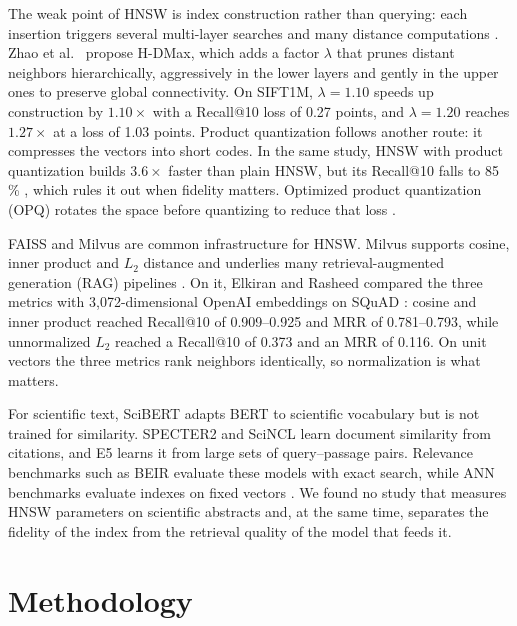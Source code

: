 \documentclass[runningheads]{llncs}
\begin{document}
The weak point of HNSW is index construction rather than querying: each insertion triggers
several multi-layer searches and many distance computations \cite{ref9}. Zhao et
al.~\cite{ref9} propose H-DMax, which adds a factor $\lambda$ that prunes distant neighbors
hierarchically, aggressively in the lower layers and gently in the upper ones to preserve
global connectivity. On SIFT1M, $\lambda=1.10$ speeds up construction by $1.10\times$ with a
Recall@10 loss of 0.27 points, and $\lambda=1.20$ reaches $1.27\times$ at a loss of 1.03
points. Product quantization \cite{ref15} follows another route: it compresses the vectors
into short codes. In the same study, HNSW with product quantization builds $3.6\times$ faster
than plain HNSW, but its Recall@10 falls to 85\,\% \cite{ref9}, which rules it out when
fidelity matters. Optimized product quantization (OPQ) rotates the space before quantizing
to reduce that loss \cite{ge2014}.

FAISS \cite{ref7} and Milvus \cite{ref8} are common infrastructure for HNSW. Milvus supports
cosine, inner product and $L_2$ distance and underlies many retrieval-augmented generation
(RAG) pipelines \cite{ref10}. On it, Elkiran and Rasheed \cite{ref11} compared the three
metrics with 3,072-dimensional OpenAI embeddings on SQuAD \cite{ref12}: cosine and inner
product reached Recall@10 of 0.909--0.925 and MRR of 0.781--0.793, while unnormalized $L_2$
reached a Recall@10 of 0.373 and an MRR of 0.116. On unit vectors the three metrics rank
neighbors identically, so normalization is what matters.

For scientific text, SciBERT \cite{ref18} adapts BERT \cite{devlin2019} to scientific
vocabulary but is not trained for similarity. SPECTER2 \cite{singh2023} and SciNCL
\cite{ostendorff2022} learn document similarity from citations, and E5 \cite{ref19} learns it
from large sets of query--passage pairs. Relevance benchmarks such as BEIR \cite{thakur2021}
evaluate these models with exact search, while ANN benchmarks evaluate indexes on fixed
vectors \cite{aumuller2020}. We found no study that measures HNSW parameters on scientific
abstracts and, at the same time, separates the fidelity of the index from the retrieval
quality of the model that feeds it.

\section{Methodology}
\end{document}
